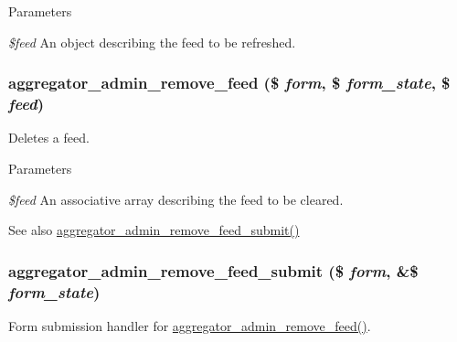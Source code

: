 \begin{DoxyParams}{Parameters}
\item[{\em \$feed}]An object describing the feed to be refreshed. \end{DoxyParams}
\hypertarget{aggregator_8admin_8inc_ab735494011ac94fbb352e6161f91e7c2}{
\subsubsection[{aggregator\_\-admin\_\-remove\_\-feed}]{\setlength{\rightskip}{0pt plus 5cm}aggregator\_\-admin\_\-remove\_\-feed (\$ {\em form}, \/  \$ {\em form\_\-state}, \/  \$ {\em feed})}}
\label{aggregator_8admin_8inc_ab735494011ac94fbb352e6161f91e7c2}
Deletes a feed.


\begin{DoxyParams}{Parameters}
\item[{\em \$feed}]An associative array describing the feed to be cleared.\end{DoxyParams}
\begin{DoxySeeAlso}{See also}
\hyperlink{aggregator_8admin_8inc_a6129f0a0c72d8e0ada1fb2f4cd40519d}{aggregator\_\-admin\_\-remove\_\-feed\_\-submit()} 
\end{DoxySeeAlso}
\hypertarget{aggregator_8admin_8inc_a6129f0a0c72d8e0ada1fb2f4cd40519d}{
\subsubsection[{aggregator\_\-admin\_\-remove\_\-feed\_\-submit}]{\setlength{\rightskip}{0pt plus 5cm}aggregator\_\-admin\_\-remove\_\-feed\_\-submit (\$ {\em form}, \/  \&\$ {\em form\_\-state})}}
\label{aggregator_8admin_8inc_a6129f0a0c72d8e0ada1fb2f4cd40519d}
Form submission handler for \hyperlink{aggregator_8admin_8inc_ab735494011ac94fbb352e6161f91e7c2}{aggregator\_\-admin\_\-remove\_\-feed()}.

